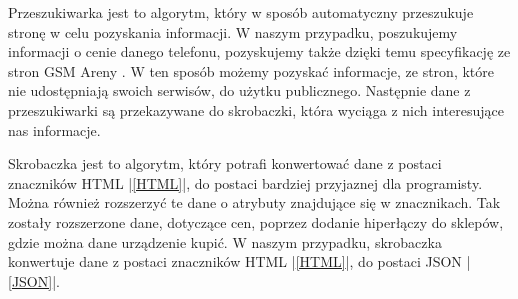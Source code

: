 Przeszukiwarka jest to algorytm, który w sposób automatyczny przeszukuje stronę w celu pozyskania informacji. W naszym przypadku, poszukujemy informacji o cenie danego telefonu, pozyskujemy także dzięki temu specyfikację ze stron GSM Areny \cite{gsm_arena}. W ten sposób możemy pozyskać informacje, ze stron, które nie udostępniają swoich serwisów, do użytku publicznego. Następnie dane z przeszukiwarki są przekazywane do skrobaczki, która wyciąga z nich interesujące nas informacje.

Skrobaczka jest to algorytm, który potrafi konwertować dane z postaci znaczników HTML |\ref{HTML}|, do postaci bardziej przyjaznej dla programisty. Można również rozszerzyć te dane o atrybuty znajdujące się w znacznikach. Tak zostały rozszerzone dane, dotyczące cen, poprzez dodanie hiperłączy do sklepów, gdzie można dane urządzenie kupić. W naszym przypadku, skrobaczka konwertuje dane z postaci znaczników HTML |\ref{HTML}|, do postaci JSON |\ref{JSON}|.
